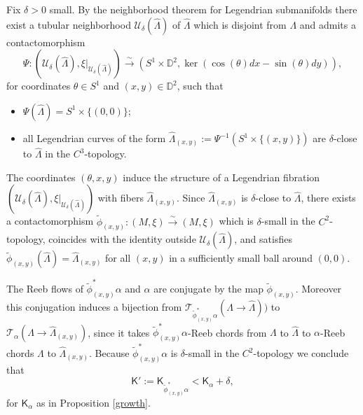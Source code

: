 \documentclass[10pt]{amsart}
\let\mathcal\mathscr
\let\ra\rightarrow
\newcommand{\isom}{\stackrel\sim\longrightarrow}
\theoremstyle{plain}
\theoremstyle{definition}
\numberwithin{equation}{subsection}
\begin{document}
Fix $\delta>0$ small. By the neighborhood theorem for Legendrian submanifolds there exist a tubular neighborhood $\mathcal{U}_\delta(\widehat{\Lambda})$
of $\widehat{\Lambda}$ which is disjoint from $\Lambda$ and admits a contactomorphism
$$\Psi:(\mathcal{U}_\delta(\widehat{\Lambda}), \xi |_{\mathcal{U}_\delta(\widehat{\Lambda})})\isom (S^1 \times \mathbb{D}^2, \ker (\cos (\theta) dx - \sin (\theta) dy)),$$ for coordinates $\theta \in S^1$ and $(x,y) \in \mathbb{D}^2$, such that
\begin{itemize}
\item $\Psi(\widehat{\Lambda}) = S^1 \times \{(0,0)\}$;
\item all Legendrian curves of the form $\widehat{\Lambda}_{(x,y)}:=\Psi^{-1}(S^1 \times \{(x,y)\}) $ are $\delta$-close to $\widehat{\Lambda}$ in the $C^3$-topology.
\end{itemize}
The coordinates $(\theta\!,x,y)$ induce the structure of a Legendrian fibration $(\mathcal{U}_\delta(\widehat{\Lambda}), \xi |_{\mathcal{U}_\delta(\widehat{\Lambda})})$ with fibers $\widehat{\Lambda}_{(x,y)}$. Since $\widehat{\Lambda}_{(x,y)}$ is $\delta$-close to $\widehat{\Lambda}$, there exists a contactomorphism $\widetilde{\phi}_{(x,y)} : (M,\xi) \isom (M,\xi)$ which is $\delta$-small in the $C^2$-topology, coincides with the identity outside $\mathcal{U}_\delta(\widehat{\Lambda})$, and satisfies $\widetilde{\phi}_{(x,y)} (\widehat{\Lambda}) = \widehat{\Lambda}_{(x,y)}$ for all $(x,y)$ in a sufficiently small ball around $(0,0)$.

The Reeb flows of $\widetilde{\phi}_{(x,y)}^* \alpha$ and $\alpha$ are conjugate by the map $\widetilde{\phi}_{(x,y)}$. Moreover this conjugation induces a bijection from $\mathcal{T}_{\widetilde{\phi}_{(x,y)}^*\alpha}(\Lambda\ra \widehat{\Lambda}))$ to $\mathcal{T}_\alpha(\Lambda\ra \widehat{\Lambda}_{(x,y)})$, since it takes $\widetilde{\phi}_{(x,y)}^*\alpha$-Reeb chords from $\Lambda$ to $\widehat{\Lambda}$ to $\alpha$-Reeb chords $\Lambda$ to $\widehat{\Lambda}_{(x,y)}$. Because $\widetilde{\phi}_{(x,y)}^* \alpha$ is $\delta$-small in the $C^2$-topology we conclude that
\begin{equation}
\mathsf{K}':=\mathsf{K}_{\widetilde{\phi}_{(x,y)}^* \alpha} < \mathsf{K}_{\alpha} + \delta,
\end{equation}
for $\mathsf{K}_{\alpha}$ as in Proposition \ref{growth}.
\end{document}
